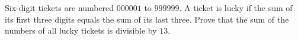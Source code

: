 Six-digit tickets are numbered $000001$ to $999999$. A ticket is lucky if the sum of its first three digits equals the sum of its last three. Prove that the sum of the numbers of all lucky tickets is divisible by $13$.

